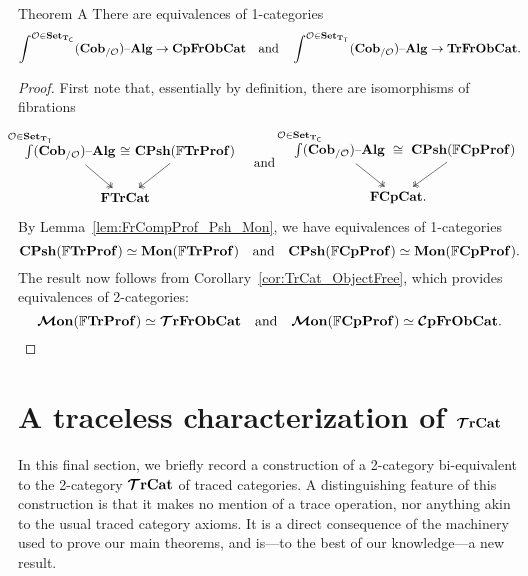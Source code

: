 \documentclass[11pt,oneside,article]{memoir}
\begin{document}
\begin{named}{Theorem A}
    \label{thm:TheoremA}
  There are equivalences of 1-categories
  \begin{equation*}
    \int^{\mathcal{O}\in\mathbf{Set}_{\mathbf{T}_{\mathsf{C}}}}(\mathbf{Cob}_{/\mathcal{O}}){\text \textendash}\mathbf{Alg} \to \mathbf{CpFrObCat}
    \quad\text{and}\quad
    \int^{\mathcal{O}\in\mathbf{Set}_{\mathbf{T}_{\mathsf{T}}}}(\mathbf{Cob}_{/\mathcal{O}}){\text \textendash}\mathbf{Alg} \to \mathbf{TrFrObCat}.
  \end{equation*}
\end{named}
\begin{proof}
  First note that, essentially by definition, there are isomorphisms of fibrations
  \begin{equation*}
    \begin{tikzcd}[column sep=-2em]
      \int\limits^{\mathclap{\LabSet\in\Set_{\TT}}}(\LCob{\LabSet})\alg
          \ar[rr,phantom,"\iso"] \ar[dr,two heads]
        && \CPsh(\dFrTrProf) \ar[dl,two heads] \\
      & \FrTrCat &
    \end{tikzcd}
    \quad\text{and}\quad
    \begin{tikzcd}[column sep=-2em]
      \int\limits^{\mathclap{\LabSet\in\Set_{\TC}}}(\LCob{\LabSet})\alg
          \ar[rr,phantom,"\iso"] \ar[dr,two heads]
        && \CPsh(\dFrCompProf) \ar[dl,two heads] \\
      & \FrCompCat. &
    \end{tikzcd}
  \end{equation*}
  By Lemma~\ref{lem:FrCompProf_Psh_Mon}, we have equivalences of 1-categories
  \begin{equation}
    \mathbf{CPsh}(\mathbb{F}\mathbf{TrProf})\simeq\mathbf{Mon}(\mathbb{F}\mathbf{TrProf})
    \quad\text{and}\quad
    \mathbf{CPsh}(\mathbb{F}\mathbf{CpProf})\simeq\mathbf{Mon}(\mathbb{F}\mathbf{CpProf}).
  \end{equation}
  The result now follows from Corollary~\ref{cor:TrCat_ObjectFree}, which provides equivalences of
  2-categories:
  \[
    \bm{\mathcal{M}}\mathbf{on}(\mathbb{F}\mathbf{TrProf})\simeq\bm{\mathcal{T}}\mathbf{rFrObCat}
    \quad\text{and}\quad
    \bm{\mathcal{M}}\mathbf{on}(\mathbb{F}\mathbf{CpProf})\simeq\bm{\mathcal{C}}\mathbf{pFrObCat}.
  \]
\end{proof}

\section{A traceless characterization of \texorpdfstring{$\bm{\mathcal{T}}\mathbf{rCat}$}{TrCat}}
  \label{sec:characterization_of_traced}

In this final section, we briefly record a construction of a 2-category bi-equivalent to the
2-category $\bm{\mathcal{T}}\mathbf{rCat}$ of traced categories. A distinguishing feature of this construction is that it
makes no mention of a trace operation, nor anything akin to the usual traced category axioms. It is
a direct consequence of the machinery used to prove our main theorems, and is---to the best of our
knowledge---a new result.
\end{document}
